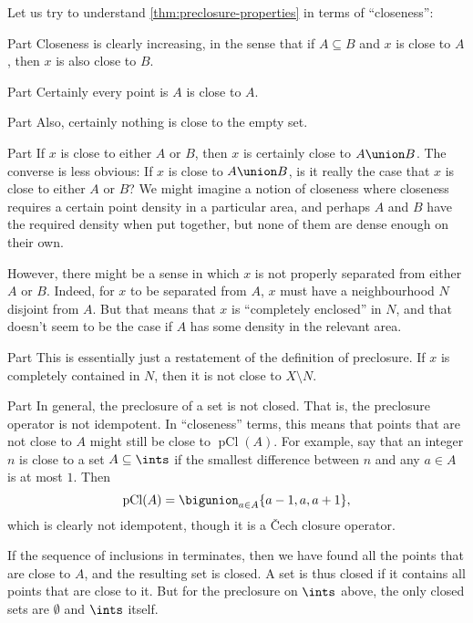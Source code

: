\documentclass[article, a4paper, 11pt, oneside]{memoir}
\numberwithin{equation}{chapter}
\newcommand{\pCl}[1]{\operatorname{pCl}(#1)}
\begin{document}
Let us try to understand \cref{thm:preclosure-properties} in terms of \enquote{closeness}:
%
\begin{proofsec}
    \item[Part \subcref{enum:preclosure-increasing}]
    Closeness is clearly increasing, in the sense that if $A \subseteq B$ and $x$ is close to $A$, then $x$ is also close to $B$.
    
    \item[Part \subcref{enum:preclosure-extensive}]
    Certainly every point is $A$ is close to $A$.

    \item[Part \subcref{enum:preclosure-nullary-unions}]
    Also, certainly nothing is close to the empty set.

    \item[Part \subcref{enum:preclosure-binary-unions}]
    If $x$ is close to either $A$ or $B$, then $x$ is certainly close to $A \union B$. The converse is less obvious: If $x$ is close to $A \union B$, is it really the case that $x$ is close to either $A$ or $B$? We might imagine a notion of closeness where closeness requires a certain point density in a particular area, and perhaps $A$ and $B$ have the required density when put together, but none of them are dense enough on their own.

    However, there might be a sense in which $x$ is not properly separated from either $A$ or $B$. Indeed, for $x$ to be separated from $A$, $x$ must have a neighbourhood $N$ disjoint from $A$. But that means that $x$ is \enquote{completely enclosed} in $N$, and that doesn't seem to be the case if $A$ has some density in the relevant area.
    
    \item[Part \subcref{enum:preclosure-characterisation-of-nhoods}]
    This is essentially just a restatement of the definition of preclosure. If $x$ is completely contained in $N$, then it is not close to $X \setminus N$.

    \item[Part \subcref{enum:preclosure-inclusion-series}]
    In general, the preclosure of a set is not closed. That is, the preclosure operator is not idempotent. In \enquote{closeness} terms, this means that points that are not close to $A$ might still be close to $\pCl{A}$. For example, say that an integer $n$ is close to a set $A \subseteq \ints$ if the smallest difference between $n$ and any $a \in A$ is at most $1$. Then
    \begin{equation*}
        \pCl{A}
            = \bigunion_{a \in A} \{a-1, a, a+1\},
    \end{equation*}
    which is clearly not idempotent, though it is a \v{C}ech closure operator.

    If the sequence of inclusions in  terminates, then we have found all the points that are close to $A$, and the resulting set is closed. A set is thus closed if it contains all points that are close to it. But for the preclosure on $\ints$ above, the only closed sets are $\emptyset$ and $\ints$ itself.
\end{proofsec}
\end{document}
